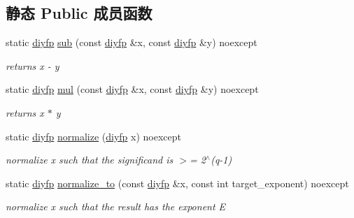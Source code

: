 \subsection*{静态 Public 成员函数}
\begin{DoxyCompactItemize}
\item 
static \mbox{\hyperlink{structnlohmann_1_1detail_1_1dtoa__impl_1_1diyfp}{diyfp}} \mbox{\hyperlink{structnlohmann_1_1detail_1_1dtoa__impl_1_1diyfp_aeb26771af54ad73598c1a0430d65d884}{sub}} (const \mbox{\hyperlink{structnlohmann_1_1detail_1_1dtoa__impl_1_1diyfp}{diyfp}} \&x, const \mbox{\hyperlink{structnlohmann_1_1detail_1_1dtoa__impl_1_1diyfp}{diyfp}} \&y) noexcept
\begin{DoxyCompactList}\small\item\em returns x -\/ y \end{DoxyCompactList}\item 
static \mbox{\hyperlink{structnlohmann_1_1detail_1_1dtoa__impl_1_1diyfp}{diyfp}} \mbox{\hyperlink{structnlohmann_1_1detail_1_1dtoa__impl_1_1diyfp_aa5f250d12ce89c81fdb08900c6a823e8}{mul}} (const \mbox{\hyperlink{structnlohmann_1_1detail_1_1dtoa__impl_1_1diyfp}{diyfp}} \&x, const \mbox{\hyperlink{structnlohmann_1_1detail_1_1dtoa__impl_1_1diyfp}{diyfp}} \&y) noexcept
\begin{DoxyCompactList}\small\item\em returns x $\ast$ y \end{DoxyCompactList}\item 
static \mbox{\hyperlink{structnlohmann_1_1detail_1_1dtoa__impl_1_1diyfp}{diyfp}} \mbox{\hyperlink{structnlohmann_1_1detail_1_1dtoa__impl_1_1diyfp_a2246b5b40c7c6992153ef174063d6aa6}{normalize}} (\mbox{\hyperlink{structnlohmann_1_1detail_1_1dtoa__impl_1_1diyfp}{diyfp}} x) noexcept
\begin{DoxyCompactList}\small\item\em normalize x such that the significand is $>$= 2$^\wedge$(q-\/1) \end{DoxyCompactList}\item 
static \mbox{\hyperlink{structnlohmann_1_1detail_1_1dtoa__impl_1_1diyfp}{diyfp}} \mbox{\hyperlink{structnlohmann_1_1detail_1_1dtoa__impl_1_1diyfp_a6b6665e467ebabe0c0f7418d3fe4b118}{normalize\+\_\+to}} (const \mbox{\hyperlink{structnlohmann_1_1detail_1_1dtoa__impl_1_1diyfp}{diyfp}} \&x, const int target\+\_\+exponent) noexcept
\begin{DoxyCompactList}\small\item\em normalize x such that the result has the exponent E \end{DoxyCompactList}\end{DoxyCompactItemize}
